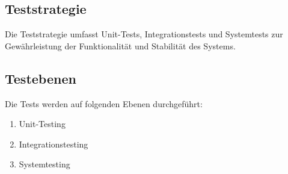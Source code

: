 \subsection{Teststrategie}
Die Teststrategie umfasst Unit-Tests, Integrationstests und Systemtests zur Gewährleistung der Funktionalität und Stabilität des Systems.

\subsection{Testebenen}
Die Tests werden auf folgenden Ebenen durchgeführt:
\begin{enumerate}
    \item Unit-Testing
    \item Integrationstesting
    \item Systemtesting
\end{enumerate}
